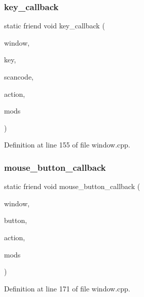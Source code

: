 \subsubsection{\texorpdfstring{key\+\_\+callback}{key\_callback}}
{\footnotesize\ttfamily static friend void key\+\_\+callback (\begin{DoxyParamCaption}\item[{G\+L\+F\+Wwindow $\ast$}]{window,  }\item[{int}]{key,  }\item[{int}]{scancode,  }\item[{int}]{action,  }\item[{int}]{mods }\end{DoxyParamCaption})\hspace{0.3cm}{\ttfamily [friend]}}



Definition at line 155 of file window.\+cpp.

\mbox{\label{classspork_1_1graphics_1_1_window_a934c179d0911e7f70088cebec526bfb6}} 
\subsubsection{\texorpdfstring{mouse\+\_\+button\+\_\+callback}{mouse\_button\_callback}}
{\footnotesize\ttfamily static friend void mouse\+\_\+button\+\_\+callback (\begin{DoxyParamCaption}\item[{G\+L\+F\+Wwindow $\ast$}]{window,  }\item[{int}]{button,  }\item[{int}]{action,  }\item[{int}]{mods }\end{DoxyParamCaption})\hspace{0.3cm}{\ttfamily [friend]}}



Definition at line 171 of file window.\+cpp.

\mbox{\label{classspork_1_1graphics_1_1_window_af7cf061faac82731cc1ac5dace7b42c1}} 
